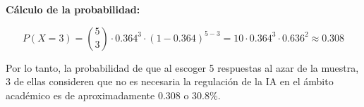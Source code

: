 \textbf{Cálculo de la probabilidad:}

\begin{equation*}
  P(X = 3) = \binom{5}{3} \cdot 0.364^3 \cdot (1 - 0.364)^{5 - 3} = 10 \cdot 0.364^3 \cdot 0.636^2 \approx 0.308
\end{equation*}

Por lo tanto, la probabilidad de que al escoger 5 respuestas al azar de la muestra, 3 de ellas consideren que no es necesaria la regulación de la IA en el ámbito académico es de aproximadamente 0.308 o 30.8\%.